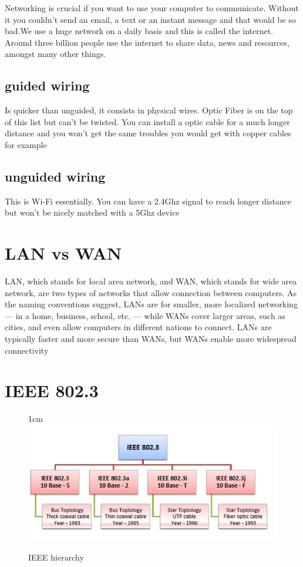 \documentclass[a4paper,12pt]{article}
\begin{document}


\newline \noindent Networking is crucial if you want to use your computer to communicate. Without it you couldn’t send an email, a text or an instant message and that would be so bad.We use a huge network on a daily basis and this is called the internet. Around three billion people use the internet to share data, news and resources, amongst many other things.
\clearpage
\subsection{guided wiring}
Is quicker than unguided, it consists in physical wires. Optic Fiber is on the top of this list but can't be twisted. You can install a optic cable for a much longer distance and you won't get the same troubles you would get with copper cables for example

\subsection{unguided wiring}
This is Wi-Fi essentially. You can have a 2.4Ghz signal to reach longer distance but won't be nicely matched with a 5Ghz device

\section{LAN vs WAN}

LAN, which stands for local area network, and WAN, which stands for wide area network, are two types of networks that allow connection between computers. As the naming conventions suggest, LANs are for smaller, more localized networking — in a home, business, school, etc. — while WANs cover larger areas, such as cities, and even allow computers in different nations to connect. LANs are typically faster and more secure than WANs, but WANs enable more widespread connectivity



\section{IEEE 802.3}

\begin{figure}[16]{1cm}
\centering
\includegraphics[width=15cm]{./ieee_802.jpg}
\vspace{-15pt}
\caption{IEEE hierarchy}\label{wrap-fig:2}
\end{figure}
\end{document}
